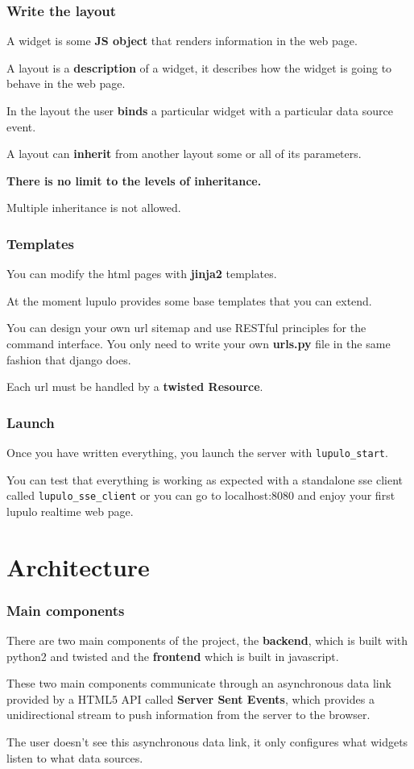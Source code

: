\documentclass{beamer}
\begin{document}
    \begin{frame}
        \frametitle{Write the layout}
        A widget is some \textbf{JS object} that renders information in the web
        page.

        A layout is a \textbf{description} of a widget, it describes how the
        widget is going to behave in the web page.

        In  the layout the user \textbf{binds} a particular widget with a
        particular data source event.

        A layout can \textbf{inherit} from another layout some or all of its
        parameters.

        \textbf{There is no limit to the levels of inheritance.}

        Multiple inheritance is not allowed.
    \end{frame}

    \begin{frame}
        \frametitle{Templates}
        You can modify the html pages with \textbf{jinja2} templates.

        At the moment lupulo provides some base templates that you can extend.

        You can design your own url sitemap and use RESTful principles for the
        command interface. You only need to write your own \textbf{urls.py} file
        in the same fashion that django does.

        Each url must be handled by a \textbf{twisted Resource}.
    \end{frame}

    \begin{frame}
        \frametitle{Launch}
        Once you have written everything, you launch the server with
        \texttt{lupulo\_start}.

        You can test that everything is working as expected with a standalone
        sse client called \texttt{lupulo\_sse\_client} or you can go to
        localhost:8080 and enjoy your first lupulo realtime web page.
    \end{frame}

    \section{Architecture}
    \begin{frame}
        \frametitle{Main components}
        There are two main components of the project, the \textbf{backend},
        which is built with python2 and twisted and the \textbf{frontend}
        which is built in javascript.

        These two main components communicate through an asynchronous data link
        provided by a HTML5 API called \textbf{Server Sent Events}, which
        provides a unidirectional stream to push information from the server to
        the browser.

        The user doesn't see this asynchronous data link, it only configures
        what widgets listen to what data sources.
    \end{frame}
\end{document}
